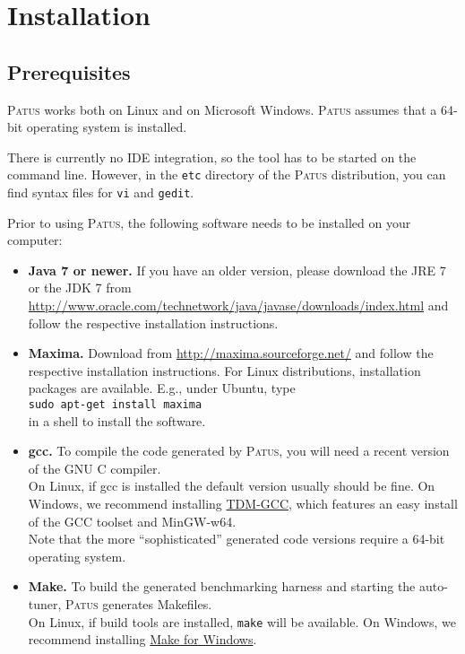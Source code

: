 \section{Installation}

\subsection{Prerequisites}

\textsc{Patus} works both on Linux and on Microsoft Windows. \textsc{Patus} assumes that
a 64-bit operating system is installed.

There is currently no IDE integration, so the tool has to be started on the command line.
However, in the \texttt{etc} directory of the \textsc{Patus} distribution, you can find syntax files
for \texttt{vi} and \texttt{gedit}.

Prior to using \textsc{Patus}, the following software needs to be installed on your computer:

\begin{itemize}
  \item \textbf{Java 7 or newer.} If you have an older version, please download the JRE 7 or the JDK 7
    from \url{http://www.oracle.com/technetwork/java/javase/downloads/index.html} and follow the
    respective installation instructions.
    
  \item \textbf{Maxima.} Download from \url{http://maxima.sourceforge.net/} and follow the respective
    installation instructions. For Linux distributions, installation packages are available.
    E.g., under Ubuntu, type\\
    \texttt{\phantom{XXXX}sudo apt-get install maxima}\\
    in a shell to install the software.
    
  \item \textbf{gcc.} To compile the code generated by \textsc{Patus}, you will need a recent version
    of the GNU C compiler.\\
    On Linux, if gcc is installed the default version usually should be fine.
    On Windows, we recommend installing \href{http://tdm-gcc.tdragon.net/}{TDM-GCC}, which features
    an easy install of the GCC toolset and MinGW-w64.\\
    Note that the more ``sophisticated'' generated code versions require a 64-bit operating system.
    
  \item \textbf{Make.} To build the generated benchmarking harness and starting the
    auto-tuner, \textsc{Patus} generates Makefiles.\\
    On Linux, if build tools are installed, \texttt{make} will be available.
    On Windows, we recommend installing \href{http://gnuwin32.sourceforge.net/packages/make.htm}{Make for Windows}.
\end{itemize}


